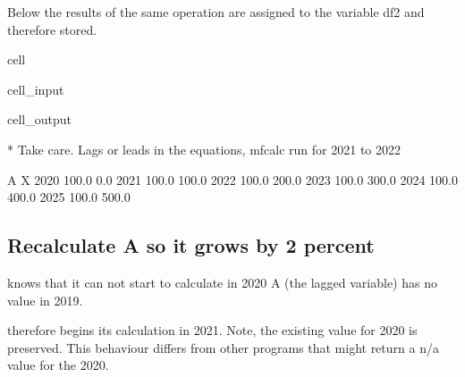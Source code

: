 \documentclass[letterpaper,10pt,english]{jupyterBook}
\begin{document}
\sphinxAtStartPar
Below the results of the same operation are assigned to the variable df2 and therefore stored.

\begin{sphinxuseclass}{cell}\begin{sphinxVerbatimInput}

\begin{sphinxuseclass}{cell_input}
\begin{sphinxVerbatim}[commandchars=\\\{\}]
 
\end{sphinxVerbatim}

\end{sphinxuseclass}\end{sphinxVerbatimInput}
\begin{sphinxVerbatimOutput}

\begin{sphinxuseclass}{cell_output}
\begin{sphinxVerbatim}[commandchars=\\\{\}]
* Take care. Lags or leads in the equations, mfcalc run for 2021 to 2022
\end{sphinxVerbatim}

\begin{sphinxVerbatim}[commandchars=\\\{\}]
          A      X
2020  100.0    0.0
2021  100.0  100.0
2022  100.0  200.0
2023  100.0  300.0
2024  100.0  400.0
2025  100.0  500.0
\end{sphinxVerbatim}

\end{sphinxuseclass}\end{sphinxVerbatimOutput}

\end{sphinxuseclass}

\subsection{Recalculate A so  it grows by 2 percent}
\label{\detokenize{content/04_PythonEssentials/mfcalc:recalculate-a-so-it-grows-by-2-percent}}
\sphinxAtStartPar
{}knows that it can not start to calculate in 2020 A (the lagged variable) has no value in 2019.

\sphinxAtStartPar
{} therefore begins its calculation in 2021. Note, the existing value for 2020 is preserved.  This behaviour differs from other programs that might return a n/a value for the 2020.
\end{document}
